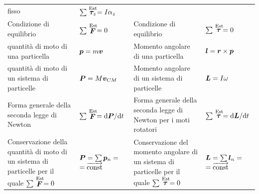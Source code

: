 \begin{small}
\begin{tabular}{p{4.0cm}p{2.45cm}p{4.0cm}p{2.38cm}}
    fisso                                             & $\sum\stackrel{\text{Est}}{\boldsymbol{\tau}_z}=I\alpha_z$                                                                                                                                                          \\
    Condizione di equilibrio                          & $\sum\stackrel{\text{Est}}{\boldsymbol{F}}=0$                                             & Condizione di equilibrio                                                                                            & $\sum\stackrel{\text{Est}}{\boldsymbol{\tau}}=0$                                                                                                                                                                                                                                                       \\
    quantità di moto di una particella                & $\boldsymbol{p}=m\boldsymbol{v}$                                                                                                      & Momento
    angolare di una particella                        & $\boldsymbol{l}=\boldsymbol{r}\times \boldsymbol{p}$                                                                                                                                                                                  \\
    quantità di moto di un sistema di particelle      & $\boldsymbol{P}=M\boldsymbol{v}_{CM}$                                           & Momento angolare di un sistema di particelle                                                                        & $\boldsymbol{L}=I\omega$                                                                                                                                                                                                                                                     \\
    Forma generale della seconda legge di
    Newton                                            & $\sum\stackrel{\text{Est}}{\boldsymbol{F}}=\mathrm{d} \boldsymbol{P}/\mathrm{d} t$                                                                  & Forma
    generale della seconda legge di Newton per i moti
    rotatori                                          & $\sum\stackrel{\text{Est}}{\boldsymbol{\tau}}=\mathrm{d} \boldsymbol{L}/\mathrm{d} t$                                                                                                                                                      \\
    Conservazione della quantità di moto di un sistema di particelle
    per il quale $\sum\stackrel{\text{Est}}{\boldsymbol{F}}=0$ & $\boldsymbol{P}=\sum
    \boldsymbol{p}_n=$ \mbox{$=\overrightarrow{\text{const}}$}         & Conservazione del momento angolare di un sistema di particelle per il quale $\sum\stackrel{\text{Est}}{\boldsymbol{\tau}}=0$ & $\boldsymbol{L}=\sum \boldsymbol{l}_n=$ \mbox{$=\overrightarrow{\text{const}}$}                                \\
    \hline
  \end{tabular}
\end{small}


